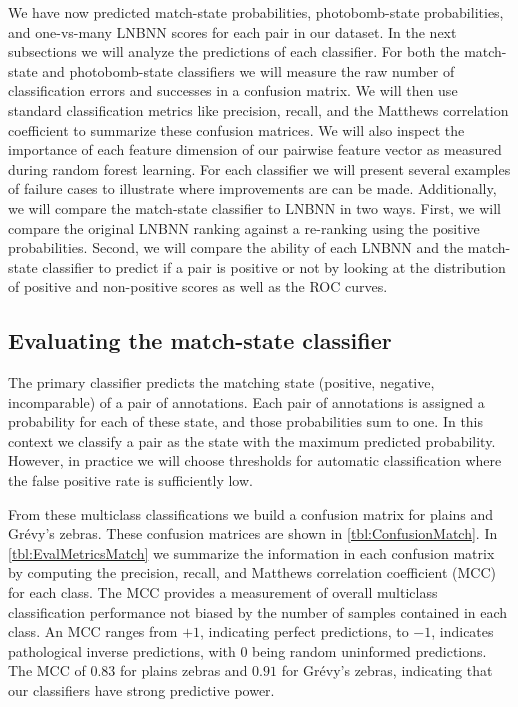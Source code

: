     We have now predicted match-state probabilities, photobomb-state probabilities, and one-vs-many LNBNN scores
      for each pair in our dataset.
    In the next subsections we will analyze the predictions of each classifier.
    For both the match-state and photobomb-state classifiers we will measure the raw number of classification
      errors and successes in a confusion matrix.
    We will then use standard classification metrics like precision, recall, and the Matthews correlation
      coefficient to summarize these confusion matrices.
    We will also inspect the importance of each feature dimension of our pairwise feature vector as measured
      during random forest learning.
    For each classifier we will present several examples of failure cases to illustrate where improvements are
      can be made.
    Additionally, we will compare the match-state classifier to LNBNN in two ways.
    First, we will compare the original LNBNN ranking against a re-ranking using the positive probabilities.
    Second, we will compare the ability of each LNBNN and the match-state classifier to predict if a pair is
      positive or not by looking at the distribution of positive and non-positive scores as well as the ROC curves.


    \FloatBarrier{}
    \subsection{Evaluating the match-state classifier}

        The primary classifier predicts the matching state (positive, negative, incomparable) of a pair of
          annotations.
        Each pair of annotations is assigned a probability for each of these state, and those probabilities sum
          to one.
        In this context we classify a pair as the state with the maximum predicted probability.
        However, in practice we will choose thresholds for automatic classification where the false positive rate
          is sufficiently low.

        From these multiclass classifications we build a confusion matrix for plains and Grévy's zebras.
        These confusion matrices are shown in \cref{tbl:ConfusionMatch}.
        In \cref{tbl:EvalMetricsMatch} we summarize the information in each confusion matrix by computing the
          precision, recall, and Matthews correlation coefficient (MCC)~\cite{powers_evaluation_2011} for each
          class.
        The MCC provides a measurement of overall multiclass classification performance not biased by the number
          of samples contained in each class.
        An MCC ranges from $+1$, indicating perfect predictions, to $-1$, indicates pathological inverse
          predictions, with $0$ being random uninformed predictions.
        The MCC of $0.83$ for plains zebras and $0.91$ for Grévy's zebras, indicating that our classifiers have
          strong predictive power.

